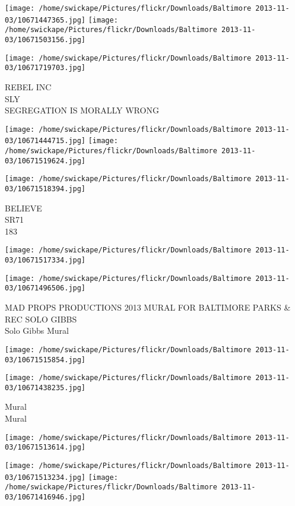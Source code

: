 \documentclass[10pt,letterpaper]{article}
\begin{document}
\texttt{[image: /home/swickape/Pictures/flickr/Downloads/Baltimore 2013-11-03/10671447365.jpg]}
\texttt{[image: /home/swickape/Pictures/flickr/Downloads/Baltimore 2013-11-03/10671503156.jpg]}

\vspace{0.25in}
\texttt{[image: /home/swickape/Pictures/flickr/Downloads/Baltimore 2013-11-03/10671719703.jpg]}

REBEL INC\\
SLY\\
SEGREGATION IS MORALLY WRONG
\pagebreak

\texttt{[image: /home/swickape/Pictures/flickr/Downloads/Baltimore 2013-11-03/10671444715.jpg]}
\texttt{[image: /home/swickape/Pictures/flickr/Downloads/Baltimore 2013-11-03/10671519624.jpg]}

\texttt{[image: /home/swickape/Pictures/flickr/Downloads/Baltimore 2013-11-03/10671518394.jpg]}

BELIEVE\\
SR71\\
183
\pagebreak

\texttt{[image: /home/swickape/Pictures/flickr/Downloads/Baltimore 2013-11-03/10671517334.jpg]}

\vspace{0.25in}
\texttt{[image: /home/swickape/Pictures/flickr/Downloads/Baltimore 2013-11-03/10671496506.jpg]}

MAD PROPS PRODUCTIONS 2013 MURAL FOR BALTIMORE PARKS \& REC SOLO GIBBS\\
Solo Gibbs Mural
\pagebreak

\texttt{[image: /home/swickape/Pictures/flickr/Downloads/Baltimore 2013-11-03/10671515854.jpg]}

\vspace{0.25in}
\texttt{[image: /home/swickape/Pictures/flickr/Downloads/Baltimore 2013-11-03/10671438235.jpg]}

Mural\\
Mural
\pagebreak

\texttt{[image: /home/swickape/Pictures/flickr/Downloads/Baltimore 2013-11-03/10671513614.jpg]}

\vspace{0.25in}
\texttt{[image: /home/swickape/Pictures/flickr/Downloads/Baltimore 2013-11-03/10671513234.jpg]}
\texttt{[image: /home/swickape/Pictures/flickr/Downloads/Baltimore 2013-11-03/10671416946.jpg]}
\end{document}
